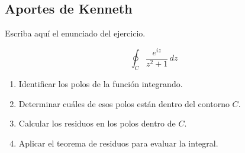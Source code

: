 \subsection{Aportes de Kenneth}


\begin{ejercicio}
Escriba aquí el enunciado del ejercicio.
\end{ejercicio}

\begin{solucion}
    \begin{equation*}
        \oint_{C} \frac{e^{iz}}{z^{2} + 1} \, dz
    \end{equation*}
    \begin{enumerate}
        \item Identificar los polos de la función integrando.
        \item Determinar cuáles de esos polos están dentro del contorno \(C\).
        \item Calcular los residuos en los polos dentro de \(C\).
        \item Aplicar el teorema de residuos para evaluar la integral.
    \end{enumerate}

\end{solucion}
